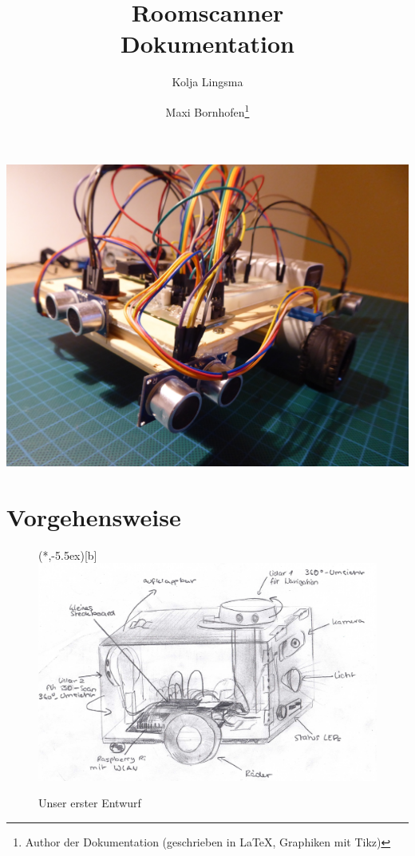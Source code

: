 \documentclass{article}
\title{
	\bf\sf\Huge Roomscanner\\[-5mm]
	\Large Dokumentation
}
\author{
Kolja Lingsma
\and
Maxi Bornhofen\thanks{Author der Dokumentation (geschrieben in \LaTeX, Graphiken mit Tikz)}
}
\newcounter{fig}
\begin{document}
\renewcommand{\baselinestretch}{1.9}
\captionsetup{font=small,labelfont=bf,singlelinecheck=off, skip=2mm}

\begin{titlepage}
\maketitle
\begin{center}
\includegraphics[width=15cm]{robo}\\[0.5cm]
\end{center}
\thispagestyle{empty}
\newpage

\tableofcontents
\newpage

\section{Vorgehensweise}
\vspace{0.3cm}
\renewcommand{\baselinestretch}{1.3}%

\begin{figure}%
	\xbox(*,-5.5ex)[b]{\includegraphics[width=\linewidth]{bild1}}%
	\caption{\sf Unser erster Entwurf}%
\end{figure}


\end{titlepage}
\end{document}
